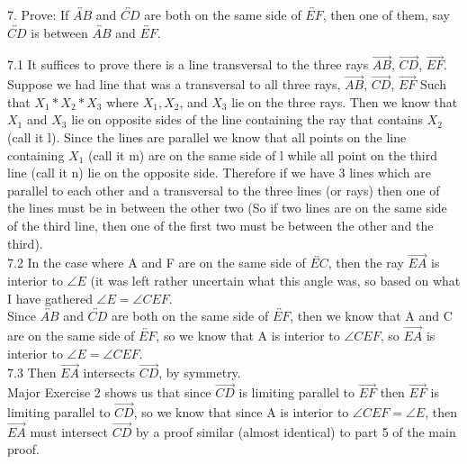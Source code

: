 \documentclass[12pt,letterpaper]{article}
\begin{document}
7. Prove: If $\overleftrightarrow{AB}$ and $\overleftrightarrow{CD}$ are both on the same side of $\overleftrightarrow{EF}$, then one of them, say $\overleftrightarrow{CD}$ is between $\overleftrightarrow{AB}$ and $\overleftrightarrow{EF}$.

7.1 It suffices to prove there is a line transversal to the three rays $\overrightarrow{AB}$, $\overrightarrow{CD}$, $\overrightarrow{EF}$.  \\

Suppose we had line that was a transversal to all three rays, $\overrightarrow{AB}$, $\overrightarrow{CD}$, $\overrightarrow{EF}$ Such that $X_1 *X_2 * X_3$ where $X_1, X_2$, and $X_3$ lie on the three rays.  Then we know that $X_1$ and $X_3$ lie on opposite sides of the line containing the ray that contains $X_2$ (call it l).  Since the lines are parallel we know that all points on the line containing $X_1$ (call it m) are on the same side of l while all point on the third line (call it n) lie on the opposite side.  Therefore if we have 3 lines which are parallel to each other and a transversal to the three lines (or rays) then one of the lines must be in between the other two (So if two lines are on the same side of the third line, then one of the first two must be between the other and the third).\\



7.2 In the case where A and F are on the same side of $\overleftrightarrow{EC}$, then the ray $\overrightarrow{EA}$ is interior to $\angle E$ (it was left rather uncertain what this angle was, so based on what I have gathered $\angle E = \angle CEF$.  \\

Since $\overleftrightarrow{AB}$ and $\overleftrightarrow{CD}$ are both on the same side of $\overleftrightarrow{EF}$, then we know that A and C are on the same side of $\overleftrightarrow{EF}$, so we know that A is interior to $\angle CEF$, so $\overrightarrow{EA}$ is interior to $\angle E = \angle CEF$.\\



7.3 Then $\overrightarrow{EA}$ intersects $\overrightarrow{CD}$, by symmetry.\\

Major Exercise 2 shows us that since $\overrightarrow{CD}$ is limiting parallel to $\overrightarrow{EF}$ then $\overrightarrow{EF}$ is limiting parallel to $\overrightarrow{CD}$, so we know that since A is interior to $\angle CEF = \angle E$, then $\overrightarrow{EA}$ must intersect $\overrightarrow{CD}$ by a proof similar (almost identical) to part 5 of the main proof. \\
\end{document}
